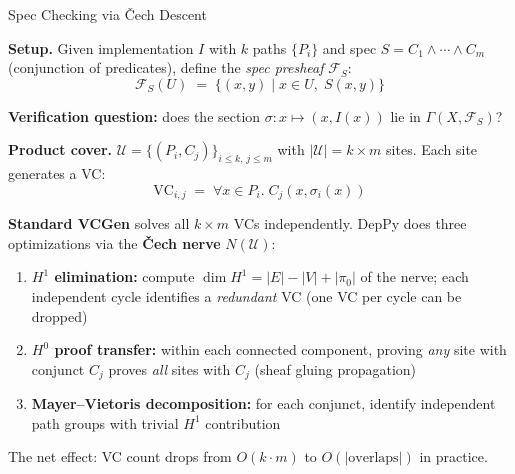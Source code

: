 \documentclass[aspectratio=169,11pt]{beamer}
\newcommand{\Sem}{\mathcal{F}}
\begin{document}
\begin{frame}{Spec Checking via \v{C}ech Descent}

\textbf{Setup.} Given implementation $I$ with $k$ paths $\{P_i\}$ and
spec $S = C_1 \wedge \cdots \wedge C_m$ (conjunction of predicates),
define the \emph{spec presheaf} $\Sem_S$:
\[
  \Sem_S(U) \;=\; \{(x, y) \mid x \in U,\; S(x, y)\}
\]

\textbf{Verification question:} does the section
$\sigma : x \mapsto (x, I(x))$ lie in $\Gamma(X, \Sem_S)$?

\vspace{0.3em}
\textbf{Product cover.}
$\mathcal{U} = \{(P_i, C_j)\}_{i \le k,\, j \le m}$ with
$|\mathcal{U}| = k \times m$ sites. Each site generates a VC:
\[
  \mathrm{VC}_{i,j} \;=\; \forall x \in P_i.\; C_j(x, \sigma_i(x))
\]

\textbf{Standard VCGen} solves all $k \times m$ VCs independently.
DepPy does three optimizations via the \textbf{\v{C}ech nerve}
$N(\mathcal{U})$:

{\small
\begin{enumerate}
  \item \textbf{$H^1$ elimination:} compute $\dim H^1 = |E| - |V| + |\pi_0|$
        of the nerve; each independent cycle identifies a \emph{redundant} VC
        (one VC per cycle can be dropped)
  \item \textbf{$H^0$ proof transfer:} within each connected component,
        proving \emph{any} site with conjunct $C_j$ proves \emph{all} sites
        with $C_j$ (sheaf gluing propagation)
  \item \textbf{Mayer--Vietoris decomposition:} for each conjunct, identify
        independent path groups with trivial $H^1$ contribution
\end{enumerate}
}

\vspace{0.2em}
{\small The net effect: VC count drops from $O(k \cdot m)$ to
$O(|\text{overlaps}|)$ in practice.}

\end{frame}
\end{document}

